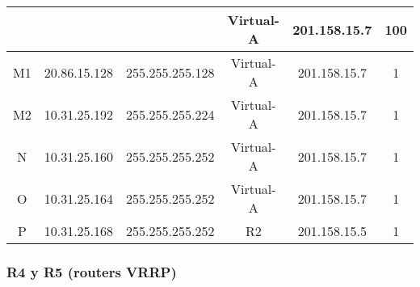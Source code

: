 \begin{tabular}{|c|c|c|c|c|c|}
	  &            &               & Virtual-A & 201.158.15.7 & 100\\
	\hline
	M1 & 20.86.15.128 & 255.255.255.128 & Virtual-A & 201.158.15.7 & 1\\
	\hline
	M2 & 10.31.25.192 & 255.255.255.224 & Virtual-A & 201.158.15.7 & 1\\
	\hline
	N & 10.31.25.160 & 255.255.255.252 & Virtual-A & 201.158.15.7 & 1\\
	\hline
	O & 10.31.25.164 & 255.255.255.252 & Virtual-A & 201.158.15.7 & 1\\
	\hline
	P & 10.31.25.168 & 255.255.255.252 & R2 & 201.158.15.5 & 1\\
	\hline
\end{tabular}

\subsubsection{R4 y R5 (routers VRRP)}

